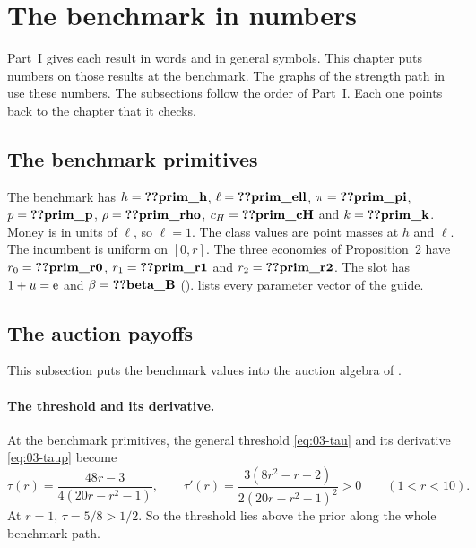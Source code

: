 \section{The benchmark in numbers}\label{sec:benchmark}

Part~I gives each result in words and in general symbols. This chapter puts numbers on those results at the
benchmark. The graphs of the strength path in  use these numbers.
The subsections follow the order of Part~I. Each one points back to the chapter that it checks.

\subsection{The benchmark primitives}\label{sec:benchmark-primitives}

The benchmark has \(h=\reg{prim_h}\), \(\ell=\reg{prim_ell}\), \(\pi=\reg{prim_pi}\), \(p=\reg{prim_p}\),
\(\rho=\reg{prim_rho}\), \(c_H=\reg{prim_cH}\) and \(k=\reg{prim_k}\). Money is in units of \(\ell\), so
\(\ell=1\). The class values are point masses at \(h\) and \(\ell\). The incumbent is uniform on \([0,r]\).
The three economies of Proposition~2 have \(r_0=\reg{prim_r0}\), \(r_1=\reg{prim_r1}\) and
\(r_2=\reg{prim_r2}\). The slot has \(1+u=\mathrm{e}\) and \(\beta=\reg{beta_B}\) ().
 lists every parameter vector of the guide.

\subsection{The auction payoffs}\label{sec:benchmark-auction}

This subsection puts the benchmark values into the auction algebra of .

\paragraph{The threshold and its derivative.} At the benchmark primitives, the general
threshold \eqref{eq:03-tau} and its derivative \eqref{eq:03-taup} become
\begin{equation}\label{eq:benchmark-tau}
\tau(r)=\frac{48r-3}{4(20r-r^2-1)},\qquad
\tau'(r)=\frac{3(8r^2-r+2)}{2(20r-r^2-1)^2}>0\qquad(1<r<10).
\end{equation}
At \(r=1\), \(\tau=5/8>1/2\). So the threshold lies above the prior along the whole benchmark path.

